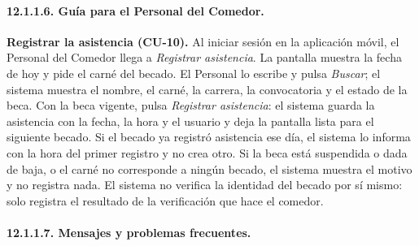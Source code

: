 \paragraph{12.1.1.6. Guía para el Personal del Comedor.}

\textbf{Registrar la asistencia (CU-10).} Al iniciar sesión en la aplicación móvil, el Personal del Comedor llega a \textit{Registrar asistencia}. La pantalla muestra la fecha de hoy y pide el carné del becado. El Personal lo escribe y pulsa \textit{Buscar}; el sistema muestra el nombre, el carné, la carrera, la convocatoria y el estado de la beca. Con la beca vigente, pulsa \textit{Registrar asistencia}: el sistema guarda la asistencia con la fecha, la hora y el usuario y deja la pantalla lista para el siguiente becado. Si el becado ya registró asistencia ese día, el sistema lo informa con la hora del primer registro y no crea otro. Si la beca está suspendida o dada de baja, o el carné no corresponde a ningún becado, el sistema muestra el motivo y no registra nada. El sistema no verifica la identidad del becado por sí mismo: solo registra el resultado de la verificación que hace el comedor.\par

\paragraph{12.1.1.7. Mensajes y problemas frecuentes.}

